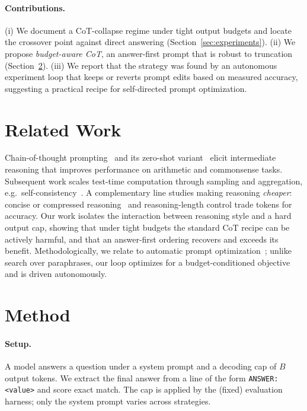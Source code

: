 \documentclass{article}
\begin{document}
\paragraph{Contributions.}
(i) We document a CoT-collapse regime under tight output budgets and locate the
crossover point against direct answering (Section~\ref{sec:experiments}).
(ii) We propose \emph{budget-aware CoT}, an answer-first prompt that is robust to
truncation (Section~\ref{sec:method}).
(iii) We report that the strategy was found by an autonomous experiment loop that
keeps or reverts prompt edits based on measured accuracy, suggesting a practical
recipe for self-directed prompt optimization.

\section{Related Work}
\label{sec:related}
Chain-of-thought prompting~\citep{wei2022chain} and its zero-shot
variant~\citep{kojima2022large} elicit intermediate reasoning that improves
performance on arithmetic and commonsense tasks. Subsequent work scales
test-time computation through sampling and aggregation, e.g.\
self-consistency~\citep{wang2023selfconsistency}. A complementary line studies
making reasoning \emph{cheaper}: concise or compressed
reasoning~\citep{nayab2024concise} and reasoning-length control trade tokens for
accuracy. Our work isolates the interaction between reasoning style and a hard
output cap, showing that under tight budgets the standard CoT recipe can be
actively harmful, and that an answer-first ordering recovers and exceeds its
benefit. Methodologically, we relate to automatic prompt
optimization~\citep{zhou2023large}; unlike search over paraphrases, our loop
optimizes for a budget-conditioned objective and is driven autonomously.

\section{Method}
\label{sec:method}
\paragraph{Setup.} A model answers a question under a system prompt and a
decoding cap of $B$ output tokens. We extract the final answer from a line of
the form \texttt{ANSWER: <value>} and score exact match. The cap is applied by
the (fixed) evaluation harness; only the system prompt varies across strategies.
\end{document}

